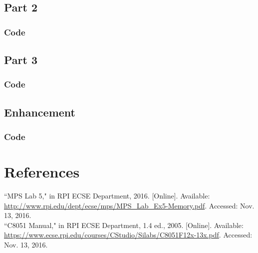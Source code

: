 \documentclass[12pt]{article}
\begin{document}
\subsection{Part 2}
\subsubsection{Code}
		
\subsection{Part 3}
\subsubsection{Code}
	
\subsection{Enhancement}
\subsubsection{Code}
	

\section{References} 
\noindent
``MPS Lab 5," in RPI ECSE Department, 2016. [Online]. Available: \url{http://www.rpi.edu/dept/ecse/mps/MPS_Lab_Ex5-Memory.pdf}. Accessed: Nov. 13, 2016.\\
\newline\noindent
``C8051 Manual," in RPI ECSE Department, 1.4 ed., 2005. [Online]. Available: \url{https://www.ecse.rpi.edu/courses/CStudio/Silabs/C8051F12x-13x.pdf}. Accessed: Nov. 13, 2016.
\end{document}
